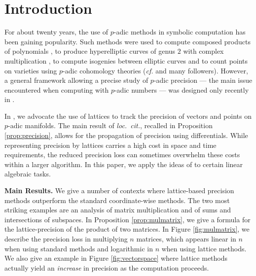 \documentclass{sig-alternate-2013}
\begin{document}
\section{Introduction}

For about twenty years, the use of $p$-adic methods in symbolic 
computation has been gaining popularity. Such methods were 
used to compute composed products of polynomials 
\cite{boston-gonzalez-perdry-schost:05a}, 
to produce hyperelliptic curves of genus $2$ with complex multiplication 
\cite{gaudry-houtmann-weng-ritzenthaler-kohel:06a},
to compute isogenies between elliptic curves \cite{lercier-sirvent:08a} 
and to count points on varieties using $p$-adic 
cohomology theories (\emph{cf.} \cite{kedlaya:01a,lauder:04a} and many
followers).
However, a general framework allowing a precise study of $p$-adic 
precision --- the main issue encountered when computing 
with $p$-adic numbers --- was designed only recently in 
\cite{caruso-roe-vaccon:14a}. 

In \cite{caruso-roe-vaccon:14a}, we advocate the use of lattices
to track the precision of vectors and points on $p$-adic manifolds.
The main result of \emph{loc.~cit.}, recalled in Proposition \ref{prop:precision},
allows for the propagation of precision using differentials.  While
representing precision by lattices carries a high
cost in space and time requirements, the reduced precision loss
can sometimes overwhelm these costs within a larger algorithm.
In this paper, we apply the ideas of \cite{caruso-roe-vaccon:14a} to
certain linear algebraic tasks.

\smallskip

\noindent
{\bf Main Results.}
We give a number of contexts where lattice-based precision methods
outperform the standard coordinate-wise methods.  The two most striking
examples are an analysis of matrix multiplication and of 
sums and intersections of subspaces.  In Proposition \ref{prop:mulmatrix},
we give a formula for the lattice-precision of the product of two matrices.
In Figure \ref{fig:mulmatrix}, we describe the precision loss in multiplying
$n$ matrices, which appears linear in $n$ when using standard methods
and logarithmic in $n$ when using lattice methods.  We also give an
example in Figure \ref{fig:vectorspace} where lattice methods
actually yield an \emph{increase} in precision as the computation
proceeds.
\end{document}

